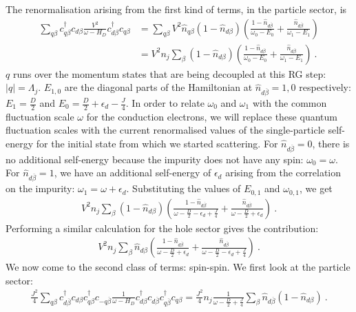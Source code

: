 The renormalisation arising from the first kind of terms, in the particle sector, is
\begin{eqnarray}
	\sum_{q\beta}c^\dagger_{q\beta}c_{d\beta}\frac{V^2}{\omega - H_D}c^\dagger_{d\beta}c_{q\beta} &= \sum_{q\beta}V^2 \hat n_{q\beta} \left( 1 - \hat n_{d\beta} \right)\left( \frac{1-\hat n_{d \overline\beta }}{\omega_0 - E_0} + \frac{\hat n_{d \overline\beta}}{\omega_1 - E_1}\right) \nonumber\\
												      &= V^2 n_j\sum_{\beta}\left( 1 - \hat n_{d\beta} \right)\left( \frac{1-\hat n_{d \overline\beta }}{\omega_0 - E_0} + \frac{\hat n_{d \overline\beta}}{\omega_1 - E_1}\right)~.
\end{eqnarray}
\(q\) runs over the momentum states that are being decoupled at this RG step: \(|q| = \Lambda_j\). \(E_{1,0}\) are the diagonal parts of the Hamiltonian at \(\hat n_{d\overline \beta}=1,0\) respectively: \(E_1 = \frac{D}{2}\) and \(E_0 = \frac{D}{2} + \epsilon_d - \frac{J}{4}\). In order to relate \(\omega_0\) and \(\omega_1\) with the common fluctuation scale \(\omega\) for the conduction electrons, we will replace these quantum fluctuation scales with the current renormalised values of the single-particle self-energy for the initial state from which we started scattering. For \(\hat n_{d\overline\beta}=0\), there is no additional self-energy because the impurity does not have any spin: \(\omega_0 = \omega\). For \(\hat n_{d\overline\beta} = 1\), we have an additional self-energy of \(\epsilon_d\) arising from the correlation on the impurity: \(\omega_1 = \omega + \epsilon_d\).
Substituting the values of \(E_{0,1}\) and \(\omega_{0,1}\), we get
\begin{eqnarray}
	\label{ren_ed_Vp}
	V^2 n_j\sum_{\beta}\left( 1 - \hat n_{d\beta} \right)\left( \frac{1-\hat n_{d \overline\beta }}{\omega - \frac{D}{2} - \epsilon_d + \frac{J}{4}} + \frac{\hat n_{d \overline\beta}}{\omega - \frac{D}{2} + \epsilon_d}\right)~.
\end{eqnarray}
Performing a similar calculation for the hole sector gives the contribution:
\begin{eqnarray}
	\label{ren_ed_Vh}
	V^2 n_j\sum_{\beta}\hat n_{d\beta}\left( \frac{1-\hat n_{d \overline\beta }}{\omega - \frac{D}{2} + \epsilon_d} + \frac{\hat n_{d \overline\beta}}{\omega - \frac{D}{2} - \epsilon_d + \frac{J}{4}}\right)~.
\end{eqnarray}
We now come to the second class of terms: spin-spin. We first look at the particle sector:
\begin{eqnarray}
	\label{ren_ed_Jpp}
	\frac{J^2}{4}\sum_{q\beta}c^\dagger_{d\overline\beta}c_{d\beta}c^\dagger_{q\beta}c_{-q\overline\beta} \frac{1}{\omega - H_D}c^\dagger_{d\beta}c_{d\overline\beta}c^\dagger_{q\overline\beta}c_{q\beta} = \frac{J^2}{4} n_j\frac{1}{\omega - \frac{D}{2} + \frac{J}{4}} \sum_{\beta}\hat n_{d\overline\beta}\left( 1 - \hat n_{d\beta} \right)~.
\end{eqnarray}
